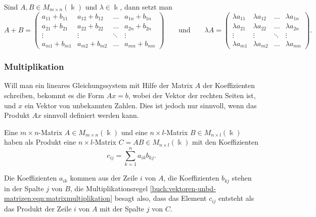 \begin{definition}
Sind $A,B\in M_{m\times n}(\Bbbk)$ und $\lambda\in\Bbbk$, dann setzt man
\[
A+B
=
\begin{pmatrix}
a_{11}+b_{11}&a_{12}+b_{12}&\dots &a_{1n}+b_{1n}\\
a_{21}+b_{21}&a_{22}+b_{22}&\dots &a_{2n}+b_{2n}\\
\vdots       &\vdots       &\ddots&\vdots       \\
a_{m1}+b_{m1}&a_{m2}+b_{m2}&\dots &a_{mn}+b_{mn}
\end{pmatrix}
\qquad\text{und}\qquad
\lambda A
=
\begin{pmatrix}
\lambda a_{11}&\lambda a_{12}&\dots &\lambda a_{1n}\\
\lambda a_{21}&\lambda a_{22}&\dots &\lambda a_{2n}\\
\vdots        &\vdots        &\ddots&\vdots        \\
\lambda a_{m1}&\lambda a_{m2}&\dots &\lambda a_{mn}
\end{pmatrix}.
\]
\end{definition}

\subsubsection{Multiplikation}
Will man ein lineares Gleichungssystem mit Hilfe der Matrix $A$ der
Koeffizienten schreiben, bekommt es die Form $Ax=b$, wobei der Vektor
der rechten Seiten ist, und $x$ ein Vektor von unbekannten Zahlen.
Dies ist jedoch nur sinnvoll, wenn das Produkt $Ax$ sinnvoll definiert
werden kann.

\begin{definition}
Eine $m\times n$-Matrix $A\in M_{m\times n}(\Bbbk)$ und eine
$n\times l$-Matrix $B\in M_{n\times l}(\Bbbk)$ haben als Produkt
eine $n\times l$-Matrix $C=AB\in M_{n\times l}(\Bbbk)$ mit den
Koeffizienten
\begin{equation}
c_{ij} = \sum_{k=1}^n a_{ik} b_{kj}.
\label{buch:vektoren-unbd-matrizen:eqn:matrixmultiplikation}
\end{equation}
\end{definition}

Die Koeffizienten $a_{ik}$ kommen aus der Zeile $i$ von $A$, die Koeffizienten
$b_{kj}$ stehen in der Spalte $j$ von $B$, die Multiplikationsregel
\eqref{buch:vektoren-unbd-matrizen:eqn:matrixmultiplikation}
besagt also, dass das Element $c_{ij}$ entsteht als das Produkt
der Zeile $i$ von $A$ mit der Spalte $j$ von $C$.

